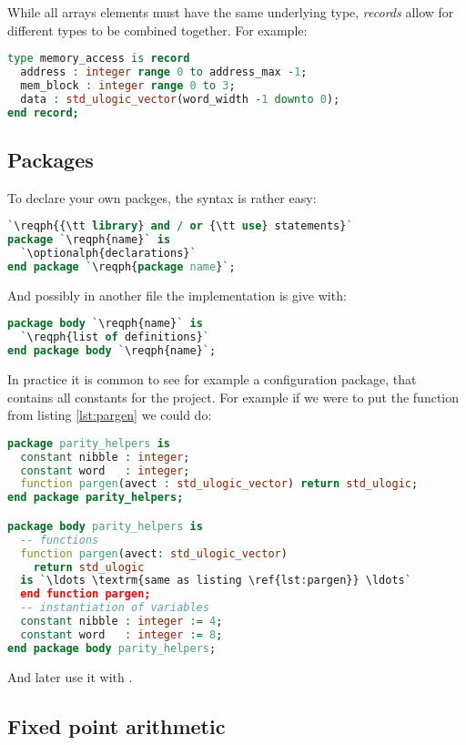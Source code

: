 \documentclass[margin=small]{tex/hsrzf}
\begin{document}
While all arrays elements must have the same underlying type, \emph{records} allow for different types to be combined together.
For example:
\begin{lstlisting}[language = vhdl]
type memory_access is record
  address : integer range 0 to address_max -1;
  mem_block : integer range 0 to 3;
  data : std_ulogic_vector(word_width -1 downto 0);
end record;
\end{lstlisting}

\subsection{Packages}

To declare your own packges, the syntax is rather easy:
\begin{lstlisting}[language = vhdl]
`\reqph{{\tt library} and / or {\tt use} statements}`
package `\reqph{name}` is
  `\optionalph{declarations}`
end package `\reqph{package name}`;
\end{lstlisting}
And possibly in another file the implementation is give with:
\begin{lstlisting}[language = vhdl]
package body `\reqph{name}` is
  `\reqph{list of definitions}`
end package body `\reqph{name}`;
\end{lstlisting}

In practice it is common to see for example a configuration package, that contains all constants for the project. For example if we were to put the function  from listing \ref{lst:pargen} we could do:
\begin{lstlisting}[language = vhdl]
package parity_helpers is
  constant nibble : integer;
  constant word   : integer;
  function pargen(avect : std_ulogic_vector) return std_ulogic;
end package parity_helpers;

package body parity_helpers is
  -- functions
  function pargen(avect: std_ulogic_vector)
    return std_ulogic
  is `\ldots \textrm{same as listing \ref{lst:pargen}} \ldots`
  end function pargen;
  -- instantiation of variables
  constant nibble : integer := 4;
  constant word   : integer := 8;
end package body parity_helpers;
\end{lstlisting}
And later use it with .

\subsection{Fixed point arithmetic}
\end{document}
